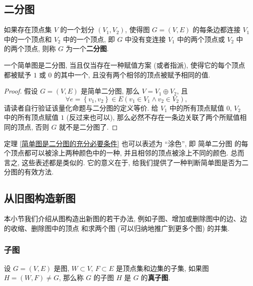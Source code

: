 \documentclass[10pt,UTF8]{book} %
\begin{document}
\subsection{二分图}

\begin{definition}
    如果存在顶点集 $V$ 的一个划分 $(V_1, V_2)$, 使得图 $G = (V, E)$ 的每条边都连接 $V_1$
    中的一个顶点和 $V_2$ 中的一个顶点, 即 $G$ 中没有变连接 $V_1$ 中的两个顶点或
    $V_2$ 中的两个顶点, 则称 $G$ 为一个\textbf{二分图}.
\end{definition}

\begin{thm}
    \label{简单图是二分图的充分必要条件}
    一个简单图是二分图, 当且仅当存在一种赋值方案 (或者指派), 使得它的每个顶点都被赋予 
    $1$ 或 $0$ 的其中一个, 且没有两个相邻的顶点被赋予相同的值.
    \begin{proof}
        假设 $G = (V,E)$ 是简单二分图, 那么 $V = V_1 \oplus V_2$, 且
        \[ \forall e=\left\{v_1, v_2\right\} \in E \left(
            v_1 \in V_1 \wedge v_2 \in V_2
        \right), \]
        请读者自行验证该量化命题与二分图的定义等价.
        给 $V_1$ 中的所有顶点赋值 $0$, $V_2$ 中的所有顶点赋值 $1$ (反过来也可以),
        那么必然不存在一条边关联了两个所赋值相同的顶点, 否则 $G$ 就不是二分图了.
    \end{proof}
\end{thm}

定理 \ref{简单图是二分图的充分必要条件} 也可以表述为 “涂色”, 即 {\kaishu 简单二分图
的每个顶点都可以被涂上两种颜色中的一种, 并且相邻的顶点被涂上不同的颜色}. 总而言之,
这些表述都是类似的. 它的意义在于, 给我们提供了一种判断简单图是否为二分图的有效方法.

\subsection{从旧图构造新图}

本小节我们介绍从图构造出新图的若干办法, 例如子图、增加或删除图中的边、边的收缩、删除图中的顶点
和求两个图 (可以归纳地推广到更多个图) 的并集.

\subsubsection{子图}

\begin{definition}
    设 $G = (V, E)$ 是图, $W \subset V$, $F \subset E$ 是顶点集和边集的子集,
    如果图 $H = (W, F) \ne G$, 那么称 $G$ 的子图 $H$ 是 $G$ 的\textbf{真子图}.
\end{definition}
\end{document}
